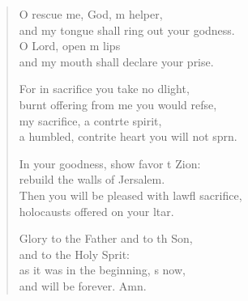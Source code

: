 \begin{verse}
\begin{patverse}
O rescue me, God, m helper,\Med\\
and my tongue shall ring out your godness.\\
O Lord, open m lips\Med\\
and my mouth shall declare your prise.

For in sacrifice you take no dlight,\Med\\
burnt offering from me you would refse,\\
my sacrifice, a contr\pointup{\i}te spirit,\Med\\
a humbled, contrite heart you will not sprn.

In your goodness, show favor t Zion:\Med\\
rebuild the walls of Jersalem.\\
Then you will be pleased with lawfl sacrifice,\Med\\
holocausts offered on your ltar.

Glory to the Father and to th Son,\Med\\
and to the Holy Sp\pointup{\i}rit:\\
as it was in the beginning, \pointup{\i}s now,\Med\\
and will be forever. Amn.
  \end{patverse}
\end{verse}

